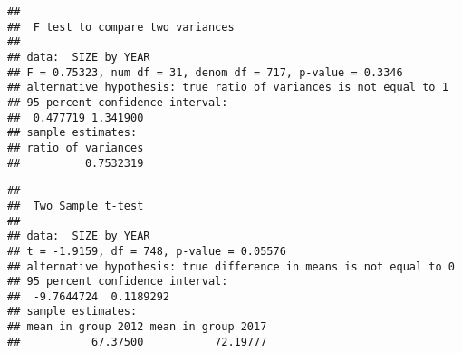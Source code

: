 \documentclass[]{article}
\newenvironment{Shaded}{\begin{snugshade}}{\end{snugshade}}
\newcommand{\KeywordTok}[1]{\textcolor[rgb]{0.13,0.29,0.53}{\textbf{{#1}}}}
\newcommand{\DataTypeTok}[1]{\textcolor[rgb]{0.13,0.29,0.53}{{#1}}}
\newcommand{\StringTok}[1]{\textcolor[rgb]{0.31,0.60,0.02}{{#1}}}
\newcommand{\CommentTok}[1]{\textcolor[rgb]{0.56,0.35,0.01}{\textit{{#1}}}}
\newcommand{\OtherTok}[1]{\textcolor[rgb]{0.56,0.35,0.01}{{#1}}}
\newcommand{\NormalTok}[1]{{#1}}
\begin{document}
\begin{verbatim}
## 
##  F test to compare two variances
## 
## data:  SIZE by YEAR
## F = 0.75323, num df = 31, denom df = 717, p-value = 0.3346
## alternative hypothesis: true ratio of variances is not equal to 1
## 95 percent confidence interval:
##  0.477719 1.341900
## sample estimates:
## ratio of variances 
##          0.7532319
\end{verbatim}

\begin{Shaded}
\end{Shaded}

\begin{verbatim}
## 
##  Two Sample t-test
## 
## data:  SIZE by YEAR
## t = -1.9159, df = 748, p-value = 0.05576
## alternative hypothesis: true difference in means is not equal to 0
## 95 percent confidence interval:
##  -9.7644724  0.1189292
## sample estimates:
## mean in group 2012 mean in group 2017 
##           67.37500           72.19777
\end{verbatim}
\end{document}
